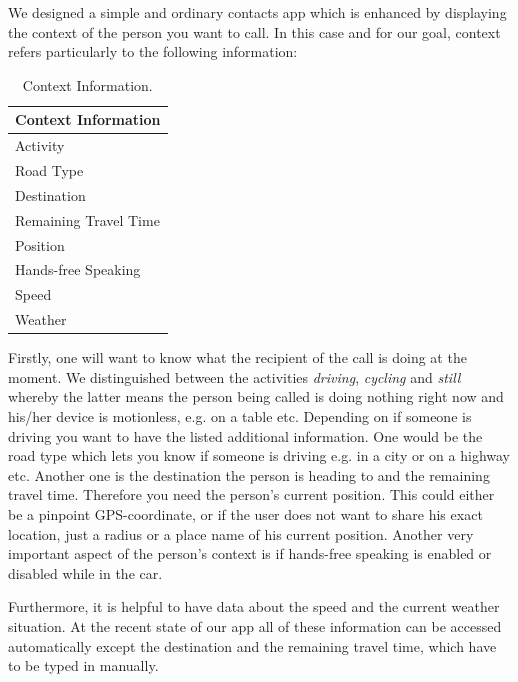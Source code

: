 \documentclass{sigchi}
\begin{document}
We designed a simple and ordinary contacts app which is enhanced by displaying the context of the person you want to call. In this case and for our goal, context refers particularly to the following information:
\newline

\begin{center}
\begin{table}[htbp]
\begin{center}
\begin{tabular}[center]{l}
\toprule
Context Information\\
\midrule
Activity \\
Road Type \\
Destination \\
Remaining Travel Time \\
Position \\
Hands-free Speaking \\
Speed \\
Weather \\
\bottomrule
\end{tabular}
\end{center}
\caption[Context Information]{Context Information.\label{tab:cont}}
\end{table}
\end{center}

Firstly, one will want to know what the recipient of the call is doing at the moment. We distinguished between the activities \textit{driving}, \textit{cycling} and \textit{still} whereby the latter means the person being called is doing nothing right now and his/her device is motionless, e.g. on a table etc. Depending on if someone is driving you want to have the listed additional information. One would be the road type which lets you know if someone is driving e.g. in a city or on a highway etc. Another one is the destination the person is heading to and the remaining travel time. Therefore you need the person's current position. This could either be a pinpoint GPS-coordinate, or if the user does not want to share his exact location, just a radius or a place name of his current position. Another very important aspect of the person's context is if hands-free speaking is enabled or disabled while in the car. 

Furthermore, it is helpful to have data about the speed and the current weather situation. At the recent state of our app all of these information can be accessed automatically except the destination and the remaining travel time, which have to be typed in manually.
\end{document}
